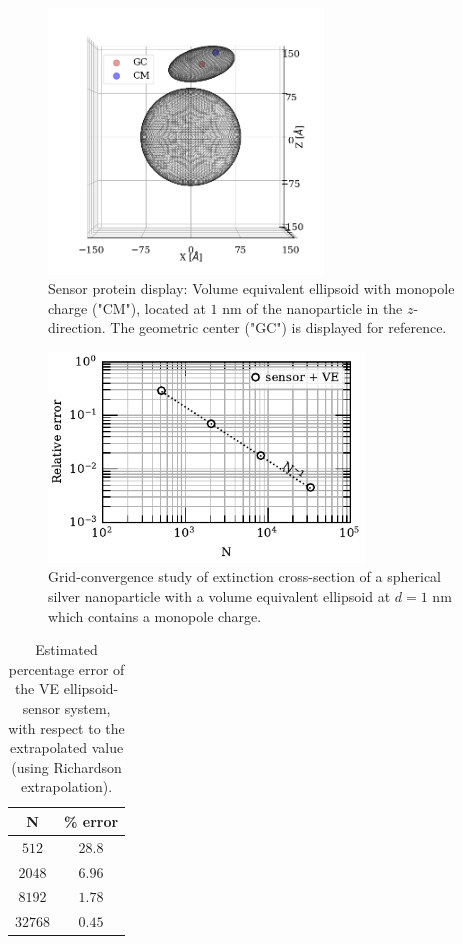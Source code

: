 \begin{figure}%
    \centering
    \includegraphics[width=0.65\textwidth]{viz/one_ve_cm_gc_display.png} 
    \caption{Sensor protein display: Volume equivalent ellipsoid with monopole charge ("CM"), located at $1$ nm of the 
    nanoparticle in the $z$-direction. The geometric center ("GC") is displayed for reference.}
    \label{fig:one_ve_sketch}
 \end{figure}


\begin{figure}%
    \centering
    \includegraphics[width=0.75\textwidth]{convergence_sensor_ve_w380.pdf} 
    \caption{Grid-convergence study of extinction cross-section of a spherical silver
             nanoparticle with a volume equivalent ellipsoid at $d=1$ nm which contains 
             a monopole charge.}
    \label{fig:err_sph-ve}
 \end{figure}

 \begin{table}%
    \centering
    \caption{\label{table:err_sph-ve} Estimated percentage error of the VE ellipsoid-sensor 
    system, with respect to the extrapolated value (using Richardson extrapolation).} 
    \begin{tabular}{c c}
    \hline%
    N & \% error \\
    \hline%
     $512$ & $28.8$ \\
     $2048$ & $6.96$ \\
     $8192$ & $1.78$ \\
     $32768$ & $0.45$ \\
    \hline%
    \end{tabular}
\end{table}

